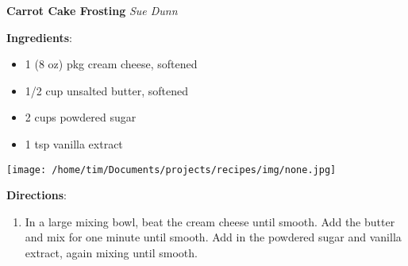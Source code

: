 \documentclass[11pt, twoside, openany]{book}
\begin{document}
\noindent\begin{minipage}[t]{\linewidth}%
{\Large\textbf{Carrot Cake Frosting}} \label{carrot-cake-frosting}\hfill\textit{Sue Dunn}\\
\noindent\begin{minipage}[t]{0.78\linewidth}%
\textbf{Ingredients}:\vspace{-3mm}
\begin{multicols}{2}
\begin{itemize}\setlength\itemsep{-1mm}
\item 1 (8 oz) pkg cream cheese, softened
\item 1/2 cup unsalted butter, softened
\item 2 cups powdered sugar
\item 1 tsp vanilla extract
\end{itemize}
\end{multicols}
\end{minipage}
\noindent\begin{minipage}[t]{0.18\linewidth}
\centering \strut\vspace*{-\baselineskip}\newline
\texttt{[image: /home/tim/Documents/projects/recipes/img/none.jpg]}\\
\end{minipage}\vspace{3mm}
\textbf{Directions}:
\vspace{-3mm}\begin{enumerate}\setlength\itemsep{-1mm}
\item In a large mixing bowl, beat the cream cheese until smooth. Add the butter and mix for one minute until smooth. Add in the powdered sugar and vanilla extract, again mixing until smooth.
\end{enumerate}
\end{minipage}\vspace{8mm}
\end{document}
